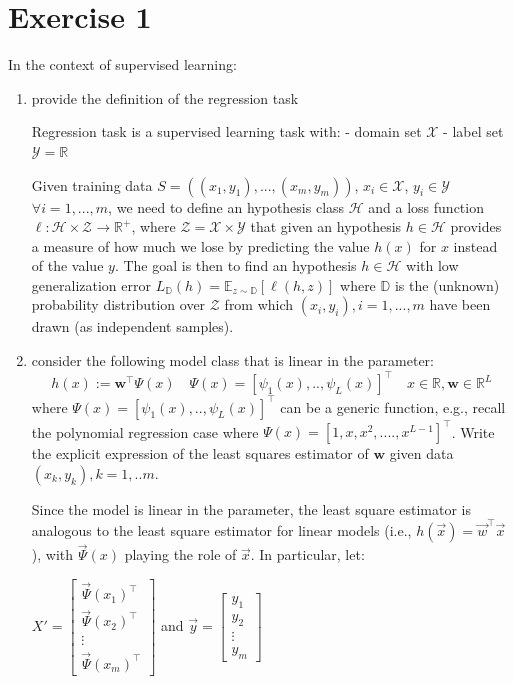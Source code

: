 \documentclass[a4paper,11pt,oneside]{book}
\begin{document}
\section{Exercise 1}
In the context of supervised learning:
\begin{enumerate}
    \item provide the definition of the regression task
        \begin{solution}
            Regression task is a supervised learning task with:
            - domain set $\mathcal{X}$
            - label set $\mathcal{Y} = \mathbb{R}$
            
            Given training data $S = ((x_1,y_1),...,(x_m,y_m))$, $x_i \in \mathcal{X}$, $y_i \in \mathcal{Y}$ $\forall i=1,...,m$, we need to define an hypothesis class $\mathcal{H}$ and a loss function $\ell: \mathcal{H} \times \mathcal{Z} \to \mathbb{R}^+$, where $\mathcal{Z} = \mathcal{X} \times \mathcal{Y}$ that given an hypothesis $h \in \mathcal{H}$ provides a measure of how much we lose by predicting the value $h(x)$ for $x$ instead of the value $y$. The goal is then to find an hypothesis $h \in \mathcal{H}$ with low generalization error $L_\mathbb{D}(h) = \mathbb{E}_{z\sim\mathbb{D}}[\ell(h,z)]$ where $\mathbb{D}$ is the (unknown) probability distribution over $\mathcal{Z}$ from which $(x_i,y_i), i=1,...,m$ have been drawn (as independent samples).
        \end{solution}
    \item consider the following model class that is linear in the parameter:
        $$h(x) := \mathbf{w}^\top\Psi(x) \quad \Psi(x) = [\psi_1(x), .., \psi_L(x)]^\top \quad x \in \mathbb{R}, \mathbf{w} \in \mathbb{R}^L$$
        where $\Psi(x) = [\psi_1(x), .., \psi_L(x)]^\top$ can be a generic function, e.g., recall the polynomial regression case where $\Psi(x) = [1, x, x^2, ...., x^{L-1}]^\top$. Write the explicit expression of the least squares estimator of $\mathbf{w}$ given data $(x_k, y_k), k = 1,..m$.

        \begin{solution}
            Since the model is linear in the parameter, the least square estimator is analogous to the least square estimator for linear models (i.e., $h(\vec{x}) = \vec{w}^\top\vec{x}$), with $\vec{\Psi}(x)$ playing the role of $\vec{x}$. In particular, let:
            
            $X' = \begin{bmatrix} \vec{\Psi}(x_1)^\top \\ \vec{\Psi}(x_2)^\top \\ \vdots \\ \vec{\Psi}(x_m)^\top \end{bmatrix}$ and $\vec{y} = \begin{bmatrix} y_1 \\ y_2 \\ \vdots \\ y_m \end{bmatrix}$
            

\end{solution}
\end{enumerate}
\end{document}
